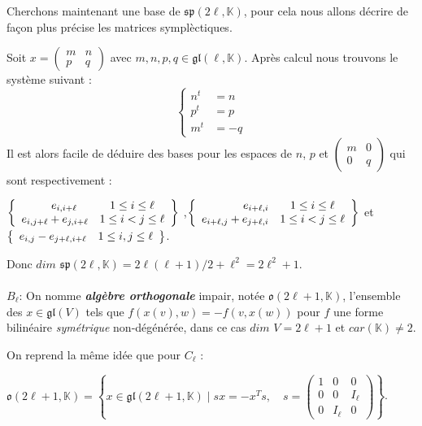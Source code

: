 \documentclass[a4paper,openany,12pt]{report}
\newcommand{\KK}{\mathbb{K}}
\newcommand{\gl}{\mathfrak{gl}}
\newcommand{\ssp}{\mathfrak{sp}}
\newcommand{\oo}{\mathfrak{o}}
\theoremstyle{break}
{\theorembodyfont{\upshape}
\newtheorem*{rmq}{Remarque :}
\newtheorem*{prv}{Preuve :}
\newtheorem*{ex}{Exemples :}
\newtheorem*{exe}{Exemple : }
\newtheorem*{nota}{Notation :}
\newtheorem*{dem}{D\'emonstration :}}
\begin{document}
Cherchons maintenant une base de $\ssp(2 \ell,\KK)$, pour cela nous allons décrire de façon plus précise les matrices symplèctiques.

Soit $ x=\begin{pmatrix} m & n \\ p & q \end{pmatrix}$ avec $m,n,p,q \in \gl(\ell, \KK)$. Après calcul nous trouvons le système suivant : 
\[ \left\{
\begin{aligned}
n^t & = n \\
p^t & =p \\
 m^t & = -q
\end{aligned}
\right. \]
\quad Il est alors facile de déduire des bases pour les espaces de $n$, $p$ et $\begin{pmatrix}
m & 0 \\ 0 & q \end{pmatrix}$ qui sont respectivement :
\begin{center}
$\left \{
   \begin{array}{r c l}
e_{i,i+\ell}\quad & 1\leq i \leq \ell \\
e_{i,j+\ell}+e_{j,i+\ell} & 1\leq i < j \leq \ell
   \end{array}
   \right  \}$
,$\left \{
   \begin{array}{r c l}
e_{i+\ell,i} &1\leq i \leq \ell \\
e_{i+\ell,j}+e_{j+\ell,i} & 1\leq i < j \leq \ell
   \end{array}
  \right   \} $
et $\left \{
   \begin{array}{r c l}
e_{i,j}-e_{j+\ell,i+\ell} &1\leq i ,j \leq \ell
   \end{array}
\right   \}$.
\end{center}

Donc $dim$ $\ssp(2\ell,\KK) = 2\ell(\ell+1)/2+\ell^2 = 2\ell^2+1$.\\
\\
$ B_{\ell} $: On nomme \emph{\textbf{algèbre orthogonale}} impair, notée  $\oo(2\ell+1,\KK)$, l'ensemble des $x \in \gl(V)$ tels que $f(x(v),w)=-f(v,x(w))$ pour $f$ une forme bilinéaire \textit{symétrique} non-dégénérée, dans ce cas $dim$ $V=2\ell+1$ et $car(\KK) \ne 2$.

On reprend la même idée que pour $ C_{\ell} $ :
 
$\oo(2\ell+1,\KK)= \left \{ x \in \gl(2\ell+1, \KK) \mid sx= -x^Ts,\quad s = \begin{pmatrix} 1 & 0 & 0 \\ 0 & 0 & I_\ell \\ 0 & I_\ell & 0 \end{pmatrix} \right \}$.
\end{document}
